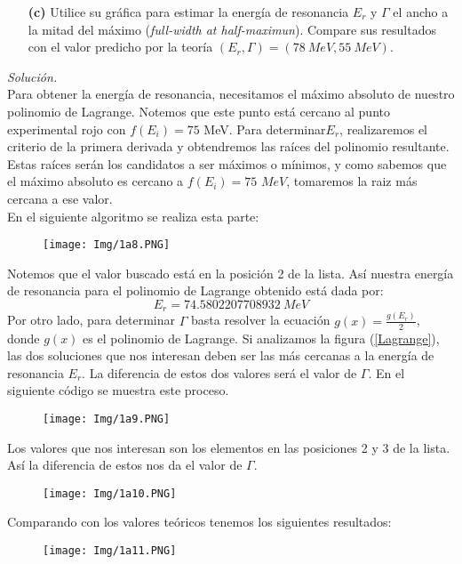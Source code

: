 \documentclass[11pt]{article}
\begin{document}
	\begin{enumerate}
		\item [\textbf{(c)}]Utilice su gráfica para estimar la energía de resonancia $E_r$ y $\Gamma$ el ancho a la mitad del máximo (\textit{full-width at half-maximun}). Compare sus resultados con el valor predicho por la teoría $(E_r,\Gamma) = (\SI{78}{MeV}, \SI{55}{MeV})$.
	\end{enumerate}
	\textit{Solución.}\\
	Para obtener la energía de resonancia, necesitamos el máximo absoluto de nuestro polinomio de Lagrange. Notemos que este punto está cercano al punto experimental rojo con $f(E_i) = 75$ MeV. Para determinar$E_r$, realizaremos el criterio de la primera derivada y obtendremos las raíces del polinomio resultante. Estas raíces serán los candidatos a ser máximos o mínimos, y como sabemos que el máximo absoluto es cercano a $f(E_i) = 75 \,\,\si{MeV}$, tomaremos la raiz más cercana a ese valor.\\
	En el siguiente algoritmo se realiza esta parte:
	\begin{figure}[h]
		\centering
		\texttt{[image: Img/1a8.PNG]}
	\end{figure}
	
	Notemos que el valor buscado está en la posición 2 de la lista. Así nuestra energía de resonancia para el polinomio de Lagrange obtenido está dada por:
	$$E_r = \SI{74.5802207708932}{MeV}$$
	Por otro lado, para determinar $\Gamma$ basta resolver la ecuación $g(x)=\frac{g(E_r)}{2}$, donde $g(x)$ es el polinomio de Lagrange. Si analizamos la figura (\ref{Lagrange}), las dos soluciones que nos interesan deben ser las más cercanas a la energía de resonancia $E_r$. La diferencia de estos dos valores será el valor de $\Gamma$. En el siguiente código se muestra este proceso.
	\begin{figure}[h]
		\centering
		\texttt{[image: Img/1a9.PNG]}
	\end{figure}

	Los valores que nos interesan son los elementos en las posiciones 2 y 3 de la lista. Así la diferencia de estos nos da el valor de $\Gamma$.
	\begin{figure}[h]
		\centering
		\texttt{[image: Img/1a10.PNG]}
	\end{figure}
	
	Comparando con los valores teóricos tenemos los siguientes resultados:
\newpage
	\begin{figure}[h]
		\centering
		\texttt{[image: Img/1a11.PNG]}
	\end{figure}
	
\end{document}
